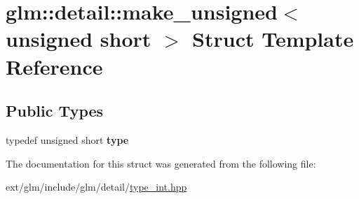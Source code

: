 \hypertarget{structglm_1_1detail_1_1make__unsigned_3_01unsigned_01short_01_4}{\section{glm\-:\-:detail\-:\-:make\-\_\-unsigned$<$ unsigned short $>$ Struct Template Reference}
\label{structglm_1_1detail_1_1make__unsigned_3_01unsigned_01short_01_4}
}
\subsection*{Public Types}
\begin{DoxyCompactItemize}
\item 
\hypertarget{structglm_1_1detail_1_1make__unsigned_3_01unsigned_01short_01_4_a42829000435f69c3a00675b6914f0d33}{typedef unsigned short {\bfseries type}}\label{structglm_1_1detail_1_1make__unsigned_3_01unsigned_01short_01_4_a42829000435f69c3a00675b6914f0d33}

\end{DoxyCompactItemize}


The documentation for this struct was generated from the following file\-:\begin{DoxyCompactItemize}
\item 
ext/glm/include/glm/detail/\hyperlink{type__int_8hpp}{type\-\_\-int.\-hpp}\end{DoxyCompactItemize}
